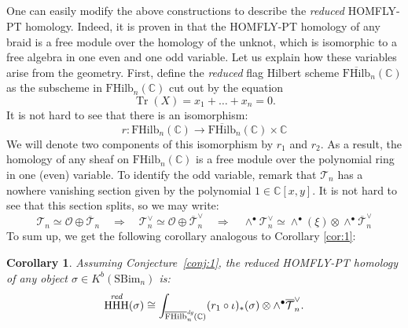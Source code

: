 \documentclass[12pt]{amsart}
\numberwithin{equation}{section}
\newtheorem{corollary}[theorem]{Corollary}
\theoremstyle{definition}
\theoremstyle{remark}
\newtheorem{remark}[theorem]{Remark}
\DeclareMathOperator{\Id}{Id}
\DeclareMathOperator{\Tr}{Tr}
\DeclareMathOperator{\HHH}{HHH}
\newcommand{\CC}{\mathbb{C}}
\newcommand{\CO}{\mathcal{O}}
\newcommand{\CT}{\mathcal{T}}
\renewcommand{\1}{\mathbf{1}}
\newcommand{\FH}{\mathrm{FHilb}}
\newcommand{\SBim}{\mathrm{SBim}}
\newcommand{\edg}{\emph{dg}}
\newcommand{\bFH}{\overline{\FH}}
\newcommand{\bCT}{\overline{\CT}}
\begin{document}

\subsection{}
\label{sub:reduced}

One can easily modify the above constructions to describe the {\em reduced} HOMFLY-PT homology. Indeed, it is proven in \cite{RasDiff} that the HOMFLY-PT homology of any braid is a free module over the homology of the unknot, which is isomorphic to a free algebra in one even and one odd variable. Let us explain how these variables arise from the geometry. First, define the {\em reduced} flag Hilbert scheme $\bFH_n(\CC)$ as the subscheme in $\FH_n(\CC)$ cut out by the equation 
$$
\Tr(X)=x_1+\ldots+x_n=0.
$$  
It is not hard to see that there is an isomorphism:
\begin{equation}
\label{eqn:reduction}
r:\FH_n(\CC)\to \bFH_n (\CC)\times \CC %
\end{equation}
 We will denote two components of this isomorphism by $r_1$ and $r_2$. As a result, the homology of any sheaf on $\FH_n(\CC)$ is a free module over the polynomial ring in one (even) variable. To identify the odd variable, remark that $\CT_n$ has a nowhere vanishing section given by the polynomial $1 \in \CC[x,y]$. It is not hard to see that this section splits, so we may write:
$$
\CT_n\simeq \CO\oplus \bCT_n \quad \Longrightarrow \quad \CT^{\vee}_n\simeq \CO\oplus \bCT^{\vee}_n \quad \Longrightarrow \quad \wedge^{\bullet}\CT^{\vee}_n\simeq \wedge^{\bullet}(\xi)\otimes \wedge^{\bullet}\bCT^{\vee}_n
$$
To sum up, we get the following corollary analogous to Corollary \ref{cor:1}:

\begin{corollary}
\label{conj:reduced}
Assuming Conjecture~\ref{conj:1}, the reduced HOMFLY-PT homology of any object $\sigma \in K^b(\SBim_n)$ is:
$$
\HHH^{\emph{red}}(\sigma) \cong \int_{\bFH^\edg_n(\CC)} (r_1 \circ \iota)_{*} (\sigma) \otimes \wedge^{\bullet}\bCT^{\vee}_n.
$$
\end{corollary}

\subsection{}
\end{document}

